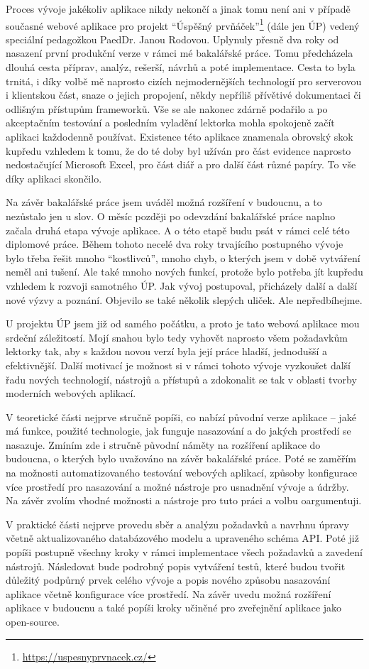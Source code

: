 Proces vývoje jakékoliv aplikace nikdy nekončí a jinak tomu není ani v případě současné webové aplikace pro projekt \enquote{Úspěšný prvňáček}\footnote{\url{https://uspesnyprvnacek.cz/}} (dále jen ÚP) vedený speciální pedagožkou PaedDr. Janou Rodovou. Uplynuly přesně dva roky od nasazení první produkční verze v rámci mé bakalářské práce. Tomu předcházela dlouhá cesta příprav, analýz, rešerší, návrhů a poté implementace. Cesta to byla trnitá, i díky volbě mě naprosto cizích nejmodernějších technologií pro serverovou i klientskou část, snaze o jejich propojení, někdy nepříliš přívětivé dokumentaci či odlišným přístupům frameworků. Vše se ale nakonec zdárně podařilo a po akceptačním testování a posledním vyladění lektorka mohla spokojeně začít aplikaci každodenně používat. Existence této aplikace znamenala obrovský skok kupředu vzhledem k tomu, že do té doby byl užíván pro část evidence naprosto nedostačující Microsoft Excel, pro část diář a pro další část různé papíry. To vše díky aplikaci skončilo.

Na závěr bakalářské práce jsem uváděl možná rozšíření v budoucnu, a to nezůstalo jen u slov. O měsíc později po odevzdání bakalářské práce naplno začala druhá etapa vývoje aplikace. A o této etapě budu psát v rámci celé této diplomové práce. Během tohoto necelé dva roky trvajícího postupného vývoje bylo třeba řešit mnoho \enquote{kostlivců}, mnoho chyb, o kterých jsem v době vytváření neměl ani tušení. Ale také mnoho nových funkcí, protože bylo potřeba jít kupředu vzhledem k rozvoji samotného ÚP. Jak vývoj postupoval, přicházely další a další nové výzvy a poznání. Objevilo se také několik slepých uliček. Ale nepředbíhejme.

U projektu ÚP jsem již od samého počátku, a proto je tato webová aplikace mou srdeční záležitostí. Mojí snahou bylo tedy vyhovět naprosto všem požadavkům lektorky tak, aby s každou novou verzí byla její práce hladší, jednodušší a efektivnější. Další motivací je možnost si v rámci tohoto vývoje vyzkoušet další řadu nových technologií, nástrojů a přístupů a zdokonalit se tak v oblasti tvorby moderních webových aplikací.

V teoretické části nejprve stručně popíši, co nabízí původní verze aplikace -- jaké má funkce, použité technologie, jak funguje nasazování a do jakých prostředí se nasazuje. Zmíním zde i stručně původní náměty na rozšíření aplikace do budoucna, o kterých bylo uvažováno na závěr bakalářské práce. Poté se zaměřím na možnosti automatizovaného testování webových aplikací, způsoby konfigurace více prostředí pro nasazování a možné nástroje pro usnadnění vývoje a údržby. Na závěr zvolím vhodné možnosti a nástroje pro tuto práci a volbu oargumentuji.

V praktické části nejprve provedu sběr a analýzu požadavků a navrhnu úpravy včetně aktualizovaného databázového modelu a upraveného schéma API. Poté již popíši postupně všechny kroky v rámci implementace všech požadavků a zavedení nástrojů. Následovat bude podrobný popis vytváření testů, které budou tvořit důležitý podpůrný prvek celého vývoje a popis nového způsobu nasazování aplikace včetně konfigurace více prostředí. Na závěr uvedu možná rozšíření aplikace v budoucnu a také popíši kroky učiněné pro zveřejnění aplikace jako open-source.